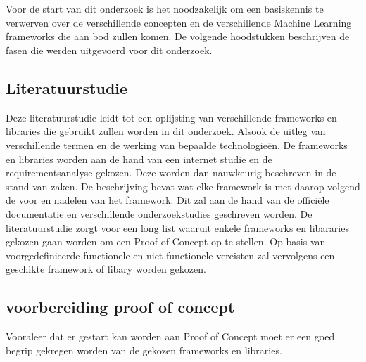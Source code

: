 
\chapter{}%
\label{ch:methodologie}


Voor de start van dit onderzoek is het noodzakelijk om een basiskennis te verwerven over de verschillende concepten en de verschillende Machine Learning frameworks die aan bod zullen komen. De volgende hoodstukken beschrijven de fasen die werden uitgevoerd voor dit onderzoek.

\section{Literatuurstudie}
Deze literatuurstudie leidt tot een oplijsting van verschillende frameworks en libraries die gebruikt zullen worden in dit onderzoek. Alsook de uitleg van verschillende termen en de werking van bepaalde technologieën.
De frameworks en libraries worden aan de hand van een internet studie en de requirementsanalyse gekozen. Deze worden dan nauwkeurig beschreven in de stand van zaken. De beschrijving bevat wat elke framework is met daarop volgend de voor en nadelen van het framework.
Dit zal aan de hand van de officiële documentatie en verschillende onderzoekstudies geschreven worden.
De literatuurstudie zorgt voor een long list waaruit enkele frameworks en libararies gekozen gaan worden om een Proof of Concept op te stellen.
Op basis van voorgedefinieerde functionele en niet functionele vereisten zal vervolgens een geschikte framework of libary worden gekozen.
\section{voorbereiding proof of concept}
Vooraleer dat er gestart kan worden aan Proof of Concept moet er een goed begrip gekregen worden van de gekozen frameworks en libraries. 

